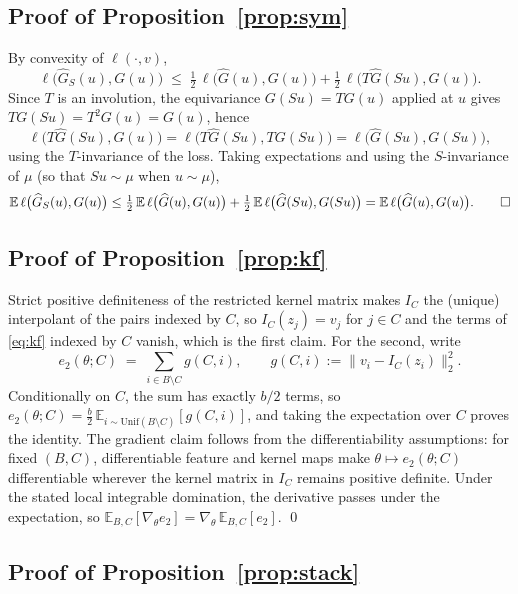 \subsection{Proof of Proposition~\ref{prop:sym}}
\label{proof:prop:sym}

By convexity of $\ell(\cdot,v)$,
\[
\ell\big(\widehat G_S(u),G(u)\big)\;\le\;\tfrac12\,\ell\big(\widehat
G(u),G(u)\big)+\tfrac12\,\ell\big(T\widehat G(Su),G(u)\big).
\]
Since $T$ is an involution, the equivariance $G(Su)=TG(u)$ applied at $u$
gives $TG(Su)=T^2G(u)=G(u)$, hence
\[
\ell\big(T\widehat G(Su),G(u)\big)=\ell\big(T\widehat G(Su),TG(Su)\big)
=\ell\big(\widehat G(Su),G(Su)\big),
\]
using the $T$-invariance of the loss. Taking expectations and using the
$S$-invariance of $\mu$ (so that $Su\sim\mu$ when $u\sim\mu$),
\[
\mathbb E\,\ell\big(\widehat G_S(u),G(u)\big)\le\tfrac12\,\mathbb
E\,\ell\big(\widehat G(u),G(u)\big)+\tfrac12\,\mathbb E\,\ell\big(\widehat
G(Su),G(Su)\big)=\mathbb E\,\ell\big(\widehat G(u),G(u)\big). \qed
\]

\subsection{Proof of Proposition~\ref{prop:kf}}
\label{proof:prop:kf}

Strict positive definiteness of the restricted kernel matrix makes $I_C$ the
(unique) interpolant of the pairs indexed by $C$, so $I_C(z_j)=v_j$ for $j\in
C$ and the terms of \eqref{eq:kf} indexed by $C$ vanish, which is the first
claim. For the second, write
\[
e_2(\theta;C)\;=\;\sum_{i\in B\setminus C} g(C,i),\qquad
g(C,i):=\|v_i-I_C(z_i)\|_2^2 .
\]
Conditionally on $C$, the sum has exactly $b/2$ terms, so
$e_2(\theta;C)=\tfrac b2\,\mathbb E_{i\sim\mathrm{Unif}(B\setminus C)}[g(C,i)]$,
and taking the expectation over $C$ proves the identity. The gradient claim
follows from the differentiability assumptions: for fixed $(B,C)$,
differentiable feature and kernel maps make
$\theta\mapsto e_2(\theta;C)$ differentiable wherever the kernel matrix in
$I_C$ remains positive definite. Under the stated local integrable
domination, the derivative passes under the expectation, so
$\mathbb E_{B,C}[\nabla_\theta e_2]=\nabla_\theta\,\mathbb E_{B,C}[e_2]$. \qed

\subsection{Proof of Proposition~\ref{prop:stack}}
\label{proof:prop:stack}

